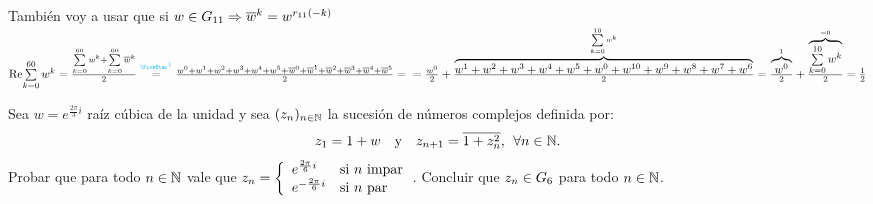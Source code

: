 \begin{enumerate}[label=\roman*)]
	      También voy a usar que si $w \en G_{11} \entonces \conj w^k = w^{r_{11}(-k)}$\\
          $\re{\sumatoria{k=0}{60}w^k} = \frac{\sumatoria{k=0}{60}w^k +\sumatoria{k=0}{60}\conj w^k}{2} \stackrel{\llamada1}=
              \frac{w^0 + w^1 + w^2 + w^3 + w^4 + w^5 + \conj w^0 + \conj w^1 + \conj w^2 + \conj w^3 + \conj w^4 + \conj w^5}{2} =\\
              = \frac{w^0}{2} + \frac{\ob{w^1 + w^2 + w^3 + w^4 + w^5 + w^0 + w^{10} + w^9 + w^8 + w^7 + w^6}{\sumatoria{k=0}{10} w^k}}{2} =
              \frac{\ob{w^0}{1}}{2} + \frac{\ob{\sumatoria{k=0}{10} w^k}{= 0}}{2} = \frac{1}{2}
	      $
\end{enumerate}


\ejercicio
Sea $w = e^{\frac{2\pi}{3}i}$ raíz cúbica de la unidad y sea $(z_n)_{n\en \naturales}$ la sucesión de números
complejos definida por:
\[
	z_1 = 1+w \quad \text{y} \quad z_{n+1} = \conj{1 + z_n^2},\, \paratodo n \en \naturales.
\]
Probar que para todo $n \en \naturales$ vale que
$z_n =
	\llave{ll}{
		e^{\frac{2\pi}{6}i}  & \text{si $n$ impar}\\
		e^{-\frac{2\pi}{6}i}  & \text{si $n$ par}
	}$. Concluir que $z_n \en G_6$ para todo $n \en \naturales$.

